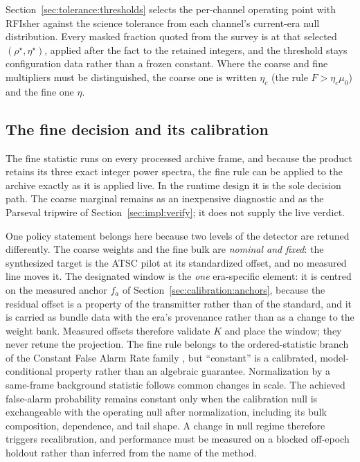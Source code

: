 Section~\ref{sec:tolerance:thresholds} selects the per-channel operating point with RFIsher against the science tolerance from each channel's current-era null distribution. Every masked fraction quoted from the survey is at that selected $(\rho^\star,\eta^\star)$, applied after the fact to the retained integers, and the threshold stays configuration data rather than a frozen constant. Where the coarse and fine multipliers must be distinguished, the coarse one is written $\eta_c$ (the rule $F > \eta_c \mu_0$) and the fine one $\eta$.

\subsection*{The fine decision and its calibration}

The fine statistic runs on every processed archive frame, and because the product retains its three exact integer power spectra, the fine rule can be applied to the archive exactly as it is applied live. In the runtime design it is the sole decision path. The coarse marginal remains as an inexpensive diagnostic and as the Parseval tripwire of Section~\ref{sec:impl:verify}; it does not supply the live verdict.

One policy statement belongs here because two levels of the detector are retuned differently. The coarse weights and the fine bulk are \emph{nominal and fixed}: the synthesized target is the ATSC pilot at its standardized offset, and no measured line moves it. The designated window is the \emph{one} era-specific element: it is centred on the measured anchor $f_a$ of Section~\ref{sec:calibration:anchors}, because the residual offset is a property of the transmitter rather than of the standard, and it is carried as bundle data with the era's provenance rather than as a change to the weight bank. Measured offsets therefore validate $K$ and place the window; they never retune the projection. The fine rule belongs to the ordered-statistic branch of the Constant False Alarm Rate family \cite{rohling1983}, but ``constant'' is a calibrated, model-conditional property rather than an algebraic guarantee. Normalization by a same-frame background statistic follows common changes in scale. The achieved false-alarm probability remains constant only when the calibration null is exchangeable with the operating null after normalization, including its bulk composition, dependence, and tail shape. A change in null regime therefore triggers recalibration, and performance must be measured on a blocked off-epoch holdout rather than inferred from the name of the method.

